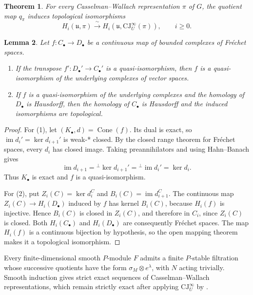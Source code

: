 \documentclass[a4paper,12pt]{amsart}
\numberwithin{equation}{section}
\theoremstyle{plain}
\newtheorem{theorem}{Theorem}[section]
\newtheorem{lemma}[theorem]{Lemma}
\theoremstyle{definition}
\theoremstyle{remark}
\begin{document}
\begin{theorem}\label{T:smooth-CJ-comparison}
For every Casselman--Wallach representation $\pi$ of $G$, the quotient map $q_\pi$ induces topological isomorphisms
\begin{equation}\label{CW-comp}
 H_i(\mathfrak u,\pi)\xrightarrow{\ \sim\ }
 H_i(\mathfrak u,\mathrm{CJ}^{\infty}_U(\pi)),\qquad i\geq0.
\end{equation}
\end{theorem}

\begin{lemma}\label{L:Frechet-duality}
Let $f:C_\bullet\to D_\bullet$ be a continuous map of bounded complexes of Fr\'echet spaces.
\begin{enumerate}
\item If the transpose $f':D_\bullet'\to C_\bullet'$ is a quasi-isomorphism, then $f$ is a quasi-isomorphism of the underlying complexes of vector spaces.
\item If $f$ is a quasi-isomorphism of the underlying complexes and the homology of $D_\bullet$ is Hausdorff, then the homology of $C_\bullet$ is Hausdorff and the induced isomorphisms are topological.
\end{enumerate}
\end{lemma}

\begin{proof}
For (1), let $(K_\bullet,d)=\operatorname{Cone}(f)$.
Its dual is exact, so $\operatorname{im}d_i'=\ker d_{i+1}'$ is weak-* closed.
By the closed range theorem for Fr\'echet spaces, every $d_i$ has closed image.
Taking preannihilators and using Hahn--Banach gives
\[
 \operatorname{im}d_{i+1}={}^{\perp}\ker d_{i+1}'={}^{\perp}\operatorname{im}d_i'=\ker d_i.
\]
Thus $K_\bullet$ is exact and $f$ is a quasi-isomorphism.

For (2), put $Z_i(C)=\ker d_i^C$ and $B_i(C)=\operatorname{im}d_{i+1}^C$.
The continuous map $Z_i(C)\to H_i(D_\bullet)$ induced by $f$ has kernel $B_i(C)$, because $H_i(f)$ is injective.
Hence $B_i(C)$ is closed in $Z_i(C)$, and therefore in $C_i$, since $Z_i(C)$ is closed.
Both $H_i(C_\bullet)$ and $H_i(D_\bullet)$ are consequently Fr\'echet spaces.
The map $H_i(f)$ is a continuous bijection by hypothesis, so the open mapping theorem makes it a topological isomorphism.
\end{proof}

Every finite-dimensional smooth $P$-module $F$ admits a finite $P$-stable filtration whose successive quotients have the form $\sigma_M\otimes e^\lambda$, with $N$ acting trivially.
Smooth induction gives strict exact sequences of Casselman--Wallach representations, which remain strictly exact after applying $\mathrm{CJ}^{\infty}_U$ by \cite[Theorem~14.3]{CWYZ}.
\end{document}
